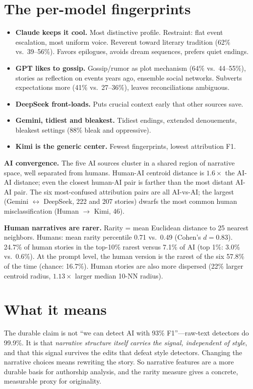 \documentclass[11pt]{article}
\begin{document}
\section{The per-model fingerprints}
\begin{itemize}
\item \textbf{Claude keeps it cool.} Most distinctive profile. Restraint: flat event escalation, most uniform voice. Reverent toward literary tradition (62\% vs.\ 39--56\%). Favors epilogues, avoids dream sequences, prefers quiet endings.
\item \textbf{GPT likes to gossip.} Gossip/rumor as plot mechanism (64\% vs.\ 44--55\%), stories as reflection on events years ago, ensemble social networks. Subverts expectations more (41\% vs.\ 27--36\%), leaves reconciliations ambiguous.
\item \textbf{DeepSeek front-loads.} Puts crucial context early that other sources save.
\item \textbf{Gemini, tidiest and bleakest.} Tidiest endings, extended denouements, bleakest settings (88\% bleak and oppressive).
\item \textbf{Kimi is the generic center.} Fewest fingerprints, lowest attribution F1.
\end{itemize}

\textbf{AI convergence.} The five AI sources cluster in a shared region of narrative space, well separated from humans. Human-AI centroid distance is $1.6\times$ the AI-AI distance; even the closest human-AI pair is farther than the most distant AI-AI pair. The six most-confused attribution pairs are all AI-vs-AI; the largest (Gemini $\leftrightarrow$ DeepSeek, 222 and 207 stories) dwarfs the most common human misclassification (Human $\rightarrow$ Kimi, 46).

\textbf{Human narratives are rarer.} Rarity = mean Euclidean distance to 25 nearest neighbors. Humans: mean rarity percentile 0.71 vs.\ 0.49 (Cohen's $d=0.83$). 24.7\% of human stories in the top-10\% rarest versus 7.1\% of AI (top 1\%: 3.0\% vs.\ 0.6\%). At the prompt level, the human version is the rarest of the six 57.8\% of the time (chance: 16.7\%). Human stories are also more dispersed (22\% larger centroid radius, $1.13\times$ larger median 10-NN radius).

\section{What it means}
The durable claim is not ``we can detect AI with 93\% F1''---raw-text detectors do 99.9\%. It is that \emph{narrative structure itself carries the signal, independent of style}, and that this signal survives the edits that defeat style detectors. Changing the narrative choices means rewriting the story. So narrative features are a more durable basis for authorship analysis, and the rarity measure gives a concrete, measurable proxy for originality.
\end{document}
